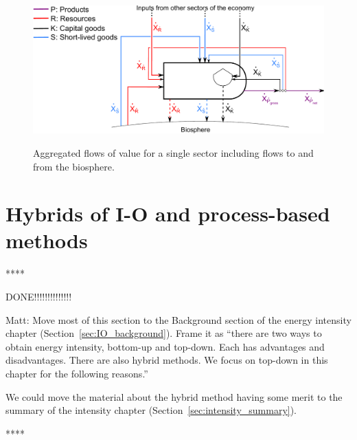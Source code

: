 \begin{figure}[ht!]
\centering\
\includegraphics[width=0.8\linewidth]{Part_3/Chapter_Unfinished/images/PERKS_basic_unit_value_with_biosphere_flows.pdf}
\caption[Aggregated flows of value for a single sector including flows to and from the biosphere]{Aggregated flows of value for a single sector including flows to and from the biosphere.}
\label{fig:basic_value_with_biosphere_flows}
\end{figure}


\section{Hybrids of I-O and process-based methods}
\label{sec:hybrid}

**** 

DONE!!!!!!!!!!!!!!

Matt: Move most of this section to the Background section
of the energy intensity chapter (Section~\ref{sec:IO_background}).
Frame it as ``there are two ways to obtain energy intensity,
bottom-up and top-down.
Each has advantages and disadvantages.
There are also hybrid methods.
We focus on top-down in this chapter for the following reasons.''

We could move the material about the hybrid method having some merit to the 
summary of the intensity chapter (Section~\ref{sec:intensity_summary}). 

****

